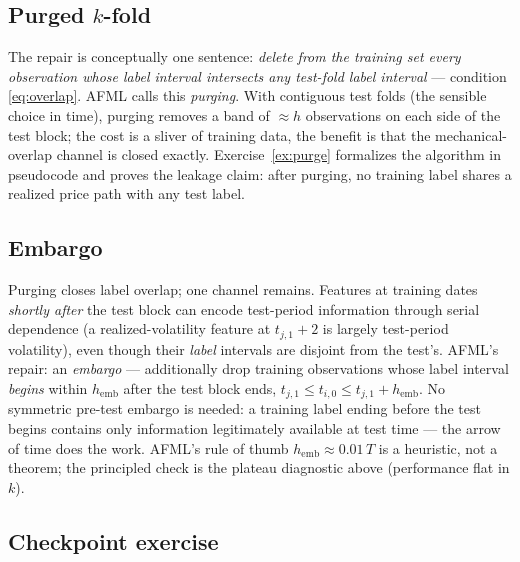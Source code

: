 \documentclass[11pt]{article}
\numberwithin{equation}{section}
\theoremstyle{plain}
\theoremstyle{definition}
\theoremstyle{remark}
\newcounter{exercise}
\begin{document}
\subsection{Purged $k$-fold}

The repair is conceptually one sentence: \emph{delete from the training set every observation whose label interval intersects any test-fold label interval} --- condition \eqref{eq:overlap}. AFML calls this \emph{purging}. With contiguous test folds (the sensible choice in time), purging removes a band of $\approx h$ observations on each side of the test block; the cost is a sliver of training data, the benefit is that the mechanical-overlap channel is closed exactly. Exercise~\ref{ex:purge} formalizes the algorithm in pseudocode and proves the leakage claim: after purging, no training label shares a realized price path with any test label.

\subsection{Embargo}

Purging closes label overlap; one channel remains. Features at training dates \emph{shortly after} the test block can encode test-period information through serial dependence (a realized-volatility feature at $t_{j,1}+2$ is largely test-period volatility), even though their \emph{label} intervals are disjoint from the test's. AFML's repair: an \emph{embargo} --- additionally drop training observations whose label interval \emph{begins} within $h_{\mathrm{emb}}$ after the test block ends, $t_{j,1} \le t_{i,0} \le t_{j,1} + h_{\mathrm{emb}}$. No symmetric pre-test embargo is needed: a training label ending before the test begins contains only information legitimately available at test time --- the arrow of time does the work. AFML's rule of thumb $h_{\mathrm{emb}} \approx 0.01\,T$ is a heuristic, not a theorem; the principled check is the plateau diagnostic above (performance flat in $k$).


\subsection*{Checkpoint exercise}
\end{document}
